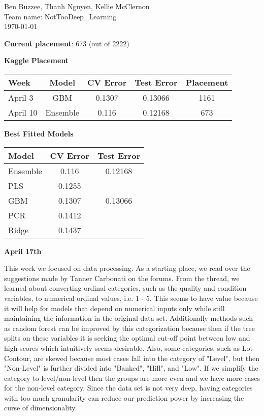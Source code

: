 \documentclass[12pt]{article}
\begin{document}
\noindent
Ben Buzzee, Thanh Nguyen, Kellie McClernon \\
Team name: NotTooDeep\_Learning \\
\today
\vspace{0.5 cm}

\textbf{Current placement}: 673 (out of 2222)

\textbf{Kaggle Placement}
\begin{center}
\begin{tabular}{l c c c c}
\hline
Week & Model & CV Error & Test Error & Placement \\
\hline
April 3 & GBM & 0.1307 & 0.13066 & 1161 \\
April 10 & Ensemble & 0.116 & 0.12168 & 673 \\
\hline
\end{tabular}
\end{center}

\textbf{Best Fitted Models}
\begin{center}
\begin{tabular}{l c c}
	\hline
	Model & CV Error & Test Error \\
	\hline
	Ensemble & 0.116 & 0.12168 \\
	PLS & 0.1255 & \\
	GBM & 0.1307 & 0.13066 \\
	PCR & 0.1412 & \\
	Ridge & 0.1437 & \\
	\hline
\end{tabular}
\end{center}

\textbf{April 17th}

This week we focused on data processing.  As a starting place, we read over the suggestions made by Tanner Carbonati on the forums.  From the thread, we learned about converting ordinal categories, such as the quality and condition variables, to numerical ordinal values, i.e. 1 - 5.  This seems to have value because it will help for models that depend on numerical inputs only while still maintaining the information in the original data set.  Additionally methods such as random forest can be improved by this categorization because then if the tree splits on these variables it is seeking the optimal cut-off point between low and high scores which intuitively seems desirable.  Also, some categories, such as Lot Contour, are skewed because most cases fall into the category of "Level", but then "Non-Level" is further divided into "Banked", "Hill", and "Low".  If we simplify the category to level/non-level then the groups are more even and we have more cases for the non-level category.  Since the data set is not very deep, having categories with too much granularity can reduce our prediction power by increasing the curse of dimensionality.  %
\end{document}
